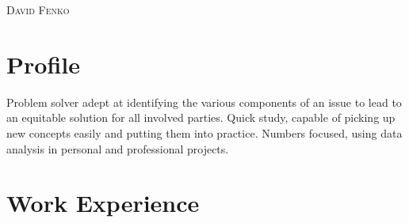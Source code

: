 \documentclass[a4paper, oneside, final]{scrartcl} %
\begin{document}
\begin{center} %


{\fontsize{24}{24}\selectfont\scshape David Fenko} %


\vspace{-5mm}


\section{Profile}

Problem solver adept at identifying the various components of an issue to lead to an equitable solution for all involved parties. Quick study, capable of picking up new concepts easily and putting them into practice. Numbers focused, using data analysis in personal and professional projects.\\



\section{Work Experience}


\end{center}
\end{document}
